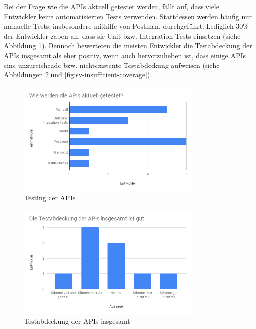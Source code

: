 Bei der Frage wie die APIs aktuell getestet werden, fällt auf, dass viele Entwickler keine automatisierten Tests verwenden. Stattdessen werden häufig nur manuelle Tests, insbesondere mithilfe von Postman, durchgeführt. Lediglich 30\% der Entwickler gaben an, dass sie Unit bzw. Integration Tests einsetzen (siehe Abbildung \ref{fig:sv-testing}). Dennoch bewerteten die meisten Entwickler die Testabdeckung der APIs insgesamt als eher positiv, wenn auch hervorzuheben ist, dass einige APIs eine unzureichende bzw. nichtexistente Testabdeckung aufweisen (siehe Abbildungen \ref{fig:sv-coverage} und \ref{fig:sv-insufficient-coverage}).

\begin{figure}[H]
\centering
  \includegraphics[width=0.8\textwidth]{../images/testing.png}
  \caption{Testing der APIs}
  \label{fig:sv-testing}
\end{figure}

\begin{figure}[H]
\centering
  \includegraphics[width=0.8\textwidth]{../images/coverage.png}
  \caption{Testabdeckung der APIs insgesamt}
  \label{fig:sv-coverage}
\end{figure}

